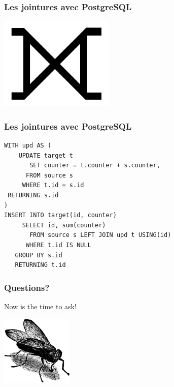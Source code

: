 \documentclass{beamer}
\begin{document}
\begin{frame}
  \frametitle{Les jointures avec PostgreSQL}

  \begin{center}
    \includegraphics[height=12em]{huge-full-outer-join.jpg}
  \end{center}
\end{frame}

\begin{frame}[fragile]
  \frametitle{Les jointures avec PostgreSQL}

  \begin{verbatim}
WITH upd AS (
    UPDATE target t
       SET counter = t.counter + s.counter,
      FROM source s
     WHERE t.id = s.id
 RETURNING s.id
)
INSERT INTO target(id, counter)
     SELECT id, sum(counter)
       FROM source s LEFT JOIN upd t USING(id)
      WHERE t.id IS NULL
   GROUP BY s.id
   RETURNING t.id
  \end{verbatim}
\end{frame}

\begin{frame}
  \frametitle{Questions?}

  \begin{center}
    Now is the time to ask!
    \vfill

    \includegraphics[height=9em]{fly.png}
  \end{center}
\end{frame}
\end{document}
